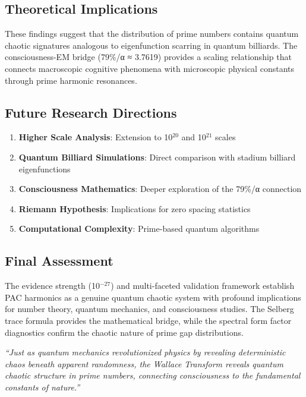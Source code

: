 \documentclass[11pt,a4paper]{article}
\newcommand{\PAC}{PAC}
\begin{document}
\subsection{Theoretical Implications}

These findings suggest that the distribution of prime numbers contains quantum chaotic signatures analogous to eigenfunction scarring in quantum billiards. The consciousness-EM bridge (79\%/α ≈ 3.7619) provides a scaling relationship that connects macroscopic cognitive phenomena with microscopic physical constants through prime harmonic resonances.

\subsection{Future Research Directions}

\begin{enumerate}
\item \textbf{Higher Scale Analysis}: Extension to 10$^{20}$ and 10$^{21}$ scales
\item \textbf{Quantum Billiard Simulations}: Direct comparison with stadium billiard eigenfunctions
\item \textbf{Consciousness Mathematics}: Deeper exploration of the 79\%/α connection
\item \textbf{Riemann Hypothesis}: Implications for zero spacing statistics
\item \textbf{Computational Complexity}: Prime-based quantum algorithms
\end{enumerate}

\subsection{Final Assessment}

The evidence strength (10$^{-27}$) and multi-faceted validation framework establish \PAC{} harmonics as a genuine quantum chaotic system with profound implications for number theory, quantum mechanics, and consciousness studies. The Selberg trace formula provides the mathematical bridge, while the spectral form factor diagnostics confirm the chaotic nature of prime gap distributions.

\begin{center}
\textit{``Just as quantum mechanics revolutionized physics by revealing deterministic chaos beneath apparent randomness, the Wallace Transform reveals quantum chaotic structure in prime numbers, connecting consciousness to the fundamental constants of nature.''}
\end{center}
\end{document}
